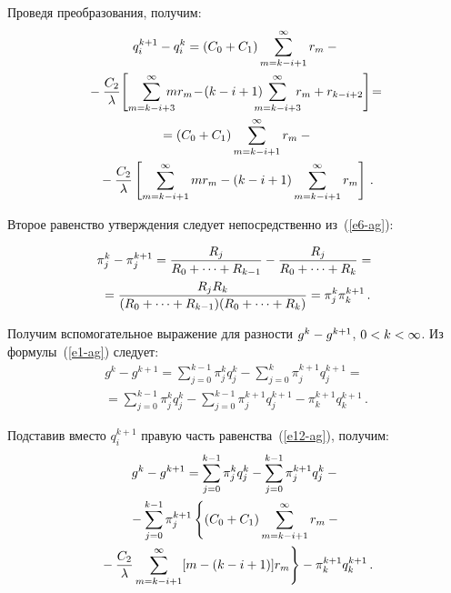 \begin{multicols}{2}
  
  Проведя преобразования, получим:
  \begin{multline*}
  q_i^{k+1} - q_i^k = \left( C_0+ C_1\right) \sum\limits_{m=k-i+1}^\infty r_m-{}\\
  {}- \fr{C_2}{\lambda}\! \left[ \sum\limits_{m=k-i+3}^\infty \hspace*{-3mm}mr_m\! -\!(k-i+1) 
\hspace*{-3mm}\sum\limits_{m=k-i+3}^\infty\hspace*{-2mm} r_m +r_{k-i+2}\right]\!={}\\
  {}= \left( C_0+C_1\right) \sum\limits_{m=k-i+1}^\infty r_m- {}\\
  {}- \fr{C_2}{\lambda} \left[ \sum\limits_{m=k-i+1}^\infty mr_m -(k-i+1) 
\sum\limits_{m=k-i+1}^\infty r_m\right]\,.
  \end{multline*}
  
  Второе равенство утверждения следует непосредственно из~(\ref{e6-ag}):
  
  \noindent
  \begin{multline*}
  \pi_j^k -\pi_j^{k+1} =\displaystyle\frac{\displaystyle R_j\mathstrut}{\displaystyle R_0+\cdots +R_{k-1}\mathstrut} - 
\displaystyle\frac{\displaystyle R_j\mathstrut}{\displaystyle R_0+\cdots+R_k\mathstrut}={}\\
  {}= \displaystyle\frac{\displaystyle R_j R_k\mathstrut}{\displaystyle (R_0+\cdots +R_{k-1}) (R_0+\cdots + R_k)\mathstrut} = \pi_j^k 
\pi_k^{k+1}\,.
  \end{multline*}
  
  Получим вспомогательное выражение для разности $g^k\hm- g^{k+1}$, 
$0\hm< k\hm<\infty$. Из формулы~(\ref{e1-ag}) следует:
  \begin{multline*}
  g^k-g^{k+1} =\sum\limits_{j=0}^{k-1} \pi_j^k q_j^k - \sum\limits_{j=0}^k 
\pi_j^{k+1} q_j^{k+1} ={}\\
  {}= \sum\limits_{j=0}^{k-1} \pi_j^k q_j^k - \sum\limits_{j=0}^{k-1} \pi_j^{k+1} 
q_j^{k+1}- \pi_k^{k+1} q_k^{k+1}\,.
  \end{multline*}
  
  Подставив вместо $q_i^{k+1}$ правую часть равенства~(\ref{e12-ag}), 
получим:
  \begin{multline*}
  g^k-g^{k+1} =\sum\limits_{j=0}^{k-1} \pi_j^k q_j^k - \sum\limits_{j=0}^{k-1} 
\pi_j^{k+1} q_j^k-{}\\
  {}- \sum\limits_{j=0}^{k-1} \pi_j^{k+1}\left\{ \left( C_0+C_1\right) 
\sum\limits^\infty_{m=k-i+1} r_m -{}\right.\\
\left.{}-\displaystyle\frac{\displaystyle C_2\mathstrut}{\displaystyle \lambda\mathstrut} \sum\limits_{m=k-
i+1}^\infty [m-(k-i+1)]r_m\right\}- \pi_k^{k+1} q_k^{k+1}\,.
  \end{multline*}
  

\end{multicols}
